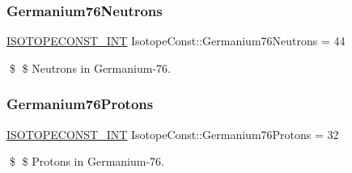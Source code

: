 \subsubsection{\texorpdfstring{Germanium76\+Neutrons}{Germanium76Neutrons}}
{\footnotesize\ttfamily \mbox{\hyperlink{group___isotope_const-_macros_ga5f18360b3e99483a35c32d789e62621c}{I\+S\+O\+T\+O\+P\+E\+C\+O\+N\+S\+T\+\_\+\+I\+NT}} Isotope\+Const\+::\+Germanium76\+Neutrons = 44}

\$ \$ Neutrons in Germanium-\/76. \mbox{\label{group___isotope_const-_germanium-_ge76_ga7f76b6003a0a6a6c932be69e5c448bdf}} 
\subsubsection{\texorpdfstring{Germanium76\+Protons}{Germanium76Protons}}
{\footnotesize\ttfamily \mbox{\hyperlink{group___isotope_const-_macros_ga5f18360b3e99483a35c32d789e62621c}{I\+S\+O\+T\+O\+P\+E\+C\+O\+N\+S\+T\+\_\+\+I\+NT}} Isotope\+Const\+::\+Germanium76\+Protons = 32}

\$ \$ Protons in Germanium-\/76. 